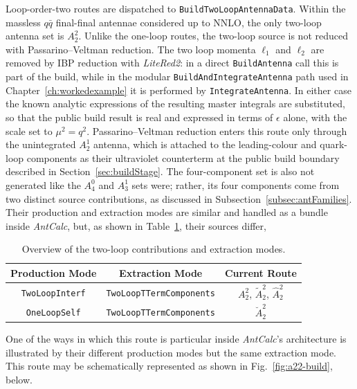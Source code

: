Loop-order-two routes are dispatched to \texttt{BuildTwoLoopAntennaData}. Within the massless
$q\bar q$ final-final antennae considered up to NNLO, the only two-loop antenna set is $A_2^2$.
Unlike the one-loop routes, the two-loop source is not reduced with Passarino--Veltman reduction.
The two loop momenta $\ell_1$ and $\ell_2$ are removed by IBP reduction with \textit{LiteRed2}: in a
direct \texttt{BuildAntenna} call this is part of the build, while in the modular
\texttt{BuildAndIntegrateAntenna} path used in Chapter~\ref{ch:workedexample} it is performed by
\texttt{IntegrateAntenna}. In either case the known analytic expressions of the resulting master
integrals are substituted, so that the public build result is real and expressed in terms of $\epsilon$ alone,
with the scale set to $\mu^2=q^2$. Passarino--Veltman reduction enters this route only through the unintegrated
$A_2^1$ antenna, which is attached to the leading-colour and quark-loop components as their
ultraviolet counterterm at the public build boundary described in Section~\ref{sec:buildStage}.
The four-component set is also not generated like the $A_4^0$ and $A_3^1$ sets were; rather, its
four components come from two distinct source contributions, as discussed in
Subsection~\ref{subsec:antFamilies}.
Their production and extraction modes are similar and handled as a bundle inside \textit{AntCalc},
but, as shown in Table~\ref{tab:twoLoopProdModes}, their sources differ,

\begin{table}[h!]
\footnotesize
\centering
\caption{Overview of the two-loop contributions and extraction modes.}
\renewcommand{\arraystretch}{1.3}
  \begin{tabular}{|c|c|c|} 
   \hline
   \textbf{Production Mode} & \textbf{Extraction Mode} & \textbf{Current Route} \\ 
   \hline
   \texttt{TwoLoopInterf} & \texttt{TwoLoopTTermComponents} & $A_2^2$, $\tilde A_2^2$, $\hat A_2^2$ \\ \hline
   \texttt{OneLoopSelf} & \texttt{TwoLoopTTermComponents} & $\breve A_2^2$ \\ \hline
  \end{tabular}

\label{tab:twoLoopProdModes}
\end{table}

One of the ways in which this route is particular inside \textit{AntCalc}'s architecture 
is illustrated by their different production modes but the same extraction mode. 
This route may be schematically represented as shown in Fig.~\ref{fig:a22-build}, below.

